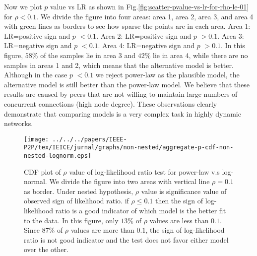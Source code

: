 Now we plot $p$ value vs LR as shown in Fig.\ref{fig:scatter-pvalue-vs-lr-for-rho-le-01} for $\rho < 0.1$.
We divide the figure into four areas: area 1, area 2, area 3, and area 4  with green lines as borders to see how sparse the points are in each area.
Area 1: LR=positive sign and $p$ $<0.1$.
Area 2: LR=positive sign and $p$ $>0.1$.
Area 3: LR=negative sign and $p$ $<0.1$.
Area 4: LR=negative sign and $p$ $>0.1$. 
In this figure, $58\%$ of the samples lie in area 3 and  $42\%$ lie in area 4, while there are no samples in areas 1 and 2, which means that the alternative model is better.
Although in the case $p$ $<0.1$ we reject power-law as the plausible model, the alternative model is still better than the power-law model. 
We believe that these results are caused by peers that are not willing to maintain large numbers of concurrent connections (high node degree).
These observations clearly demonstrate that comparing models is a very complex task in highly dynamic networks.


\begin{figure}[!tb]
\begin{center}
\texttt{[image: ../../../papers/IEEE-P2P/tex/IEICE/jurnal/graphs/non-nested/aggregate-p-cdf-non-nested-lognorm.eps]}
\end{center}
\caption{CDF plot of $\rho$ value of log-likelihood ratio test for power-law v.s 
         log-normal.
         We divide the figure into two areas with vertical line  $\rho=0.1$ as border.
         Under nested hypothesis, $\rho$ value is significance value of observed sign of likelihood ratio.
         if $\rho \le 0.1$ then the sign of log-likelihood ratio is a good indicator of which model is the better fit to the data.
         In this figure, only $13\%$ of $\rho$ values are less than $0.1$. 
         Since $87\%$ of $\rho$ values are more than $0.1$, the sign of log-likelihood ratio is not good indicator and the test does not favor either model over the other. 
         } %
\label{fig:cdf-p-lognorm}
\end{figure}

